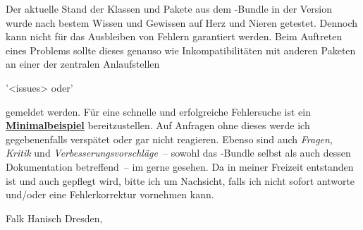 Der aktuelle Stand der Klassen und Pakete aus dem \TUDScript-Bundle in der 
Version~\vTUDScript{} wurde nach bestem Wissen und Gewissen auf Herz und Nieren 
getestet. Dennoch kann nicht für das Ausbleiben von Fehlern garantiert werden. 
Beim Auftreten eines Problems sollte dieses genauso wie Inkompatibilitäten mit 
anderen Paketen an einer der zentralen Anlaufstellen
\begin{quoting}
\renewcommand*\hrfn[2]{\url{#1}~(#2)}
\GitHubRepo'<issues> oder\newline\Forum'%
\end{quoting}
gemeldet werden. Für eine schnelle und erfolgreiche Fehlersuche ist ein 
\href{http://www.komascript.de/minimalbeispiel}{\textbf{Minimalbeispiel}} 
bereitzustellen. Auf Anfragen ohne dieses werde ich gegebenenfalls verspätet 
oder gar nicht reagieren. Ebenso sind auch \emph{Fragen}, \emph{Kritik} und 
\emph{Verbesserungsvorschläge}~-- sowohl das \TUDScript-Bundle selbst als auch 
dessen Dokumentation betreffend~-- im \TUDForum gerne gesehen. Da \TUDScript in 
meiner Freizeit entstanden ist und auch gepflegt wird, bitte ich um Nachsicht, 
falls ich nicht sofort antworte und/oder eine Fehlerkorrektur vornehmen kann.

\bigskip\bigskip
\noindent Falk Hanisch\newline
Dresden, 
